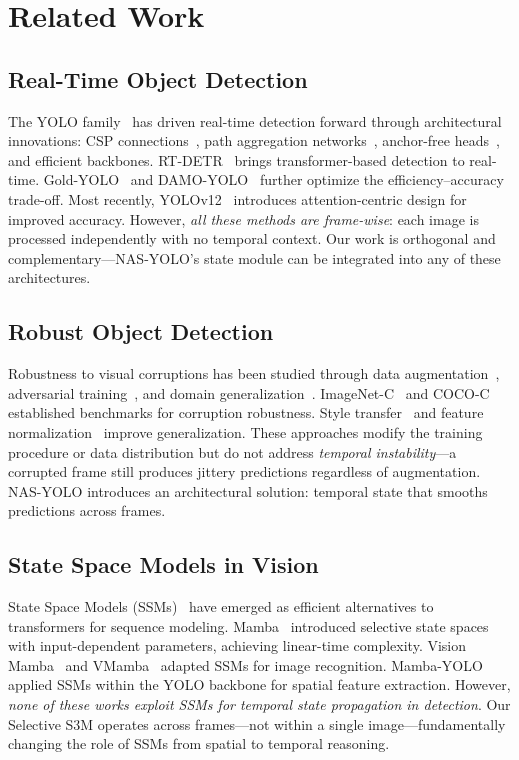 \documentclass[review]{eccv2026}
\begin{document}
\section{Related Work}
\label{sec:related}

\subsection{Real-Time Object Detection}

The YOLO family~\cite{yolov1,yolov3,yolov4,yolov5,yolov7,yolov8,yolov9,yolov10,yolov11,yolov12} has driven real-time detection forward through architectural innovations: CSP connections~\cite{cspnet}, path aggregation networks~\cite{panet}, anchor-free heads~\cite{fcos,yolox}, and efficient backbones.
RT-DETR~\cite{rtdetr} brings transformer-based detection to real-time.
Gold-YOLO~\cite{goldyolo} and DAMO-YOLO~\cite{damoyolo} further optimize the efficiency--accuracy trade-off.
Most recently, YOLOv12~\cite{yolov12} introduces attention-centric design for improved accuracy.
However, \textit{all these methods are frame-wise}: each image is processed independently with no temporal context.
Our work is orthogonal and complementary---NAS-YOLO's state module can be integrated into any of these architectures.

\subsection{Robust Object Detection}

Robustness to visual corruptions has been studied through data augmentation~\cite{hendrycks2019augmix,autoaugment}, adversarial training~\cite{advtrain}, and domain generalization~\cite{domaingeneral}.
ImageNet-C~\cite{imagenetc} and COCO-C~\cite{cococ} established benchmarks for corruption robustness.
Style transfer~\cite{stylizedimgnet} and feature normalization~\cite{ibn} improve generalization.
These approaches modify the training procedure or data distribution but do not address \textit{temporal instability}---a corrupted frame still produces jittery predictions regardless of augmentation.
NAS-YOLO introduces an architectural solution: temporal state that smooths predictions across frames.

\subsection{State Space Models in Vision}

State Space Models (SSMs)~\cite{s4,mamba} have emerged as efficient alternatives to transformers for sequence modeling.
Mamba~\cite{mamba} introduced selective state spaces with input-dependent parameters, achieving linear-time complexity.
Vision Mamba~\cite{visionmamba} and VMamba~\cite{vmamba} adapted SSMs for image recognition.
Mamba-YOLO~\cite{mambayolo} applied SSMs within the YOLO backbone for spatial feature extraction.
However, \textit{none of these works exploit SSMs for temporal state propagation in detection}.
Our Selective S3M operates across frames---not within a single image---fundamentally changing the role of SSMs from spatial to temporal reasoning.
\end{document}
